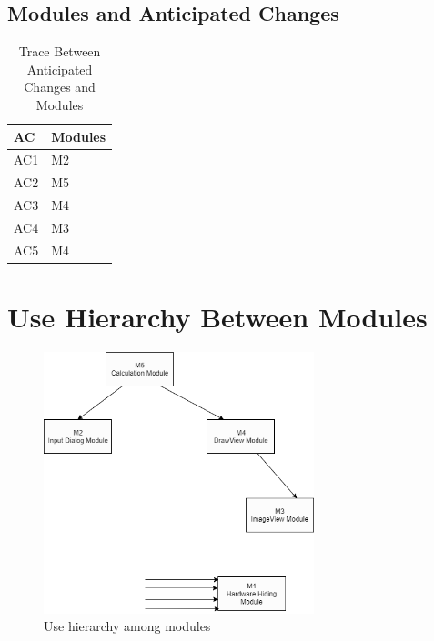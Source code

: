\documentclass[12pt, titlepage]{article}
\begin{document}
\subsection{Modules and Anticipated Changes}
\begin{table}[H]
\centering
\begin{tabular}{p{} p{}}
\toprule
\textbf{AC} & \textbf{Modules}\\
\midrule
AC1 & M2\\
AC2 & M5\\
AC3 & M4\\
AC4 & M3\\
AC5 & M4\\

\bottomrule
\end{tabular}
\caption{Trace Between Anticipated Changes and Modules}
\label{TblACT}
\end{table}

\section{Use Hierarchy Between Modules} \label{SecUse}

\begin{figure}[H]
\centering
\includegraphics[width=0.7\textwidth]{UsesHierarchy.png}
\caption{Use hierarchy among modules}
\label{FigUH}
\end{figure}
\end{document}
